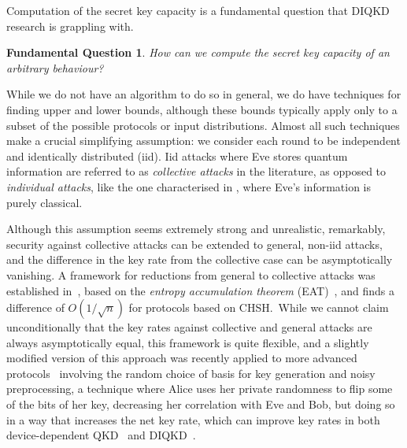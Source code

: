 \documentclass[10pt, a4paper]{article}
\numberwithin{equation}{section} %
\theoremstyle{definition}
\theoremstyle{plain}
\newtheorem{funqn}{Fundamental Question}
\newcommand{\?}{\mathrel{?}} %
\begin{document}
    Computation of the secret key capacity is a fundamental question that DIQKD research is grappling with.
    \begin{funqn}\label{fqn:cap}
      How can we compute the secret key capacity of an arbitrary behaviour?
    \end{funqn}
    While we do not have an algorithm to do so in general, we do have techniques for finding upper and lower bounds, although these bounds typically apply only to a subset of the possible protocols or input distributions. Almost all such techniques make a crucial simplifying assumption: we consider each round to be independent and identically distributed (iid). Iid attacks where Eve stores quantum information are referred to as \emph{collective attacks} in the literature, as opposed to \emph{individual attacks}, like the one characterised in , where Eve's information is purely classical.

    Although this assumption seems extremely strong and unrealistic, remarkably, security against collective attacks can be extended to general, non-iid attacks, and the difference in the key rate from the collective case can be asymptotically vanishing. A framework for reductions from general to collective attacks was established in~\cite{DI_Proofs}, based on the \emph{entropy accumulation theorem} (EAT)~\cite{EntAcc}, and finds a difference of \(O(1/\sqrt{n})\) for protocols based on CHSH.\ While we cannot claim unconditionally that the key rates against collective and general attacks are always asymptotically equal, this framework is quite flexible, and a slightly modified version of this approach was recently applied to more advanced protocols~\cite{DIQKD_FiniteSize} involving the random choice of basis for key generation and noisy preprocessing, a technique where Alice uses her private randomness to flip some of the bits of her key, decreasing her correlation with Eve and Bob, but doing so in a way that increases the net key rate, which can improve key rates in both device-dependent QKD~\cite{NoisyPreproc} and DIQKD~\cite{BFF_QRE, AsymmetricCHSH, DIQKD_FiniteSize}.
\end{document}
